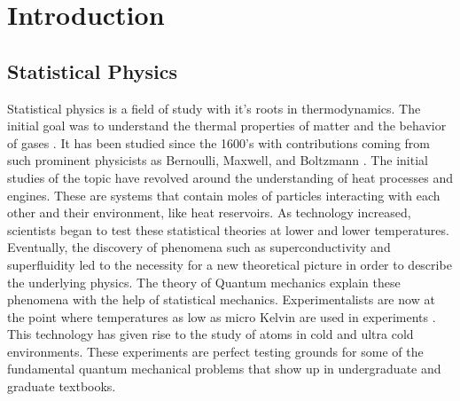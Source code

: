 \chapter{Introduction} \label{ch:introduction}
\section{Statistical Physics}
Statistical physics is a field of study with it's roots in thermodynamics. The initial goal was to understand the thermal properties of matter and the behavior of gases \cite{Kardar}. It has been studied since the 1600's with contributions coming from such prominent physicists as Bernoulli, Maxwell, and Boltzmann \cite{Flamm1998}. The initial studies of the topic have revolved around the understanding of heat processes and engines. These are systems that contain moles of particles interacting with each other and their environment, like heat reservoirs. As technology increased, scientists began to test these statistical theories at lower and lower temperatures. Eventually, the discovery of phenomena such as superconductivity and superfluidity led to the necessity for a new theoretical picture in order to describe the underlying physics. The theory of Quantum mechanics explain these phenomena with the help of statistical mechanics. Experimentalists are now at the point where temperatures as low as micro Kelvin are used in experiments \cite{Onofrio2016}\cite{Es2010}. This technology has given rise to the study of atoms in cold and ultra cold environments. These experiments are perfect testing grounds for some of the fundamental quantum mechanical problems that show up in undergraduate and graduate textbooks.

